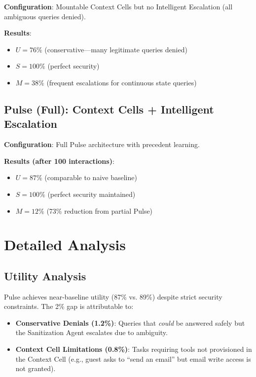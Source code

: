 \textbf{Configuration}: Mountable Context Cells but no Intelligent Escalation (all ambiguous queries denied).

\textbf{Results}:
\begin{itemize}
    \item $U = 76\%$ (conservative—many legitimate queries denied)
    \item $S = 100\%$ (perfect security)
    \item $M = 38\%$ (frequent escalations for continuous state queries)
\end{itemize}

\subsection{Pulse (Full): Context Cells + Intelligent Escalation}

\textbf{Configuration}: Full Pulse architecture with precedent learning.

\textbf{Results (after 100 interactions)}:
\begin{itemize}
    \item $U = 87\%$ (comparable to naive baseline)
    \item $S = 100\%$ (perfect security maintained)
    \item $M = 12\%$ (73\% reduction from partial Pulse)
\end{itemize}

\section{Detailed Analysis}

\subsection{Utility Analysis}

Pulse achieves near-baseline utility (87\% vs. 89\%) despite strict security constraints. The 2\% gap is attributable to:

\begin{itemize}
    \item \textbf{Conservative Denials (1.2\%)}: Queries that \textit{could} be answered safely but the Sanitization Agent escalates due to ambiguity.
    \item \textbf{Context Cell Limitations (0.8\%)}: Tasks requiring tools not provisioned in the Context Cell (e.g., guest asks to ``send an email'' but email write access is not granted).
\end{itemize}

